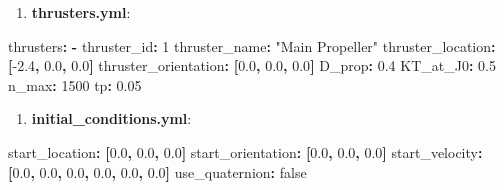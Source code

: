 \documentclass[
  letterpaper,
  DIV=11,
  numbers=noendperiod]{scrreprt}
\newenvironment{Shaded}{\begin{snugshade}}{\end{snugshade}}
\newcommand{\AttributeTok}[1]{\textcolor[rgb]{0.40,0.45,0.13}{#1}}
\newcommand{\CharTok}[1]{\textcolor[rgb]{0.13,0.47,0.30}{#1}}
\newcommand{\DecValTok}[1]{\textcolor[rgb]{0.68,0.00,0.00}{#1}}
\newcommand{\FloatTok}[1]{\textcolor[rgb]{0.68,0.00,0.00}{#1}}
\newcommand{\FunctionTok}[1]{\textcolor[rgb]{0.28,0.35,0.67}{#1}}
\newcommand{\KeywordTok}[1]{\textcolor[rgb]{0.00,0.23,0.31}{\textbf{#1}}}
\newcommand{\StringTok}[1]{\textcolor[rgb]{0.13,0.47,0.30}{#1}}
\providecommand{\tightlist}{%
  \setlength{\itemsep}{0pt}\setlength{\parskip}{0pt}}\usepackage{longtable,booktabs,array}
\begin{document}
\begin{enumerate}
\def\labelenumi{\arabic{enumi}.}
\setcounter{enumi}{5}
\tightlist
\item
  \textbf{thrusters.yml}:
\end{enumerate}

\begin{Shaded}
\begin{Highlighting}[]
\FunctionTok{thrusters}\KeywordTok{:}
\AttributeTok{  }\KeywordTok{{-}}\AttributeTok{ }\FunctionTok{thruster\_id}\KeywordTok{:}\AttributeTok{ }\DecValTok{1}
\AttributeTok{    }\FunctionTok{thruster\_name}\KeywordTok{:}\AttributeTok{ }\StringTok{"Main Propeller"}
\AttributeTok{    }\FunctionTok{thruster\_location}\KeywordTok{:}\AttributeTok{ }\KeywordTok{[}\FloatTok{{-}2.4}\KeywordTok{,}\AttributeTok{ }\FloatTok{0.0}\KeywordTok{,}\AttributeTok{ }\FloatTok{0.0}\KeywordTok{]}
\AttributeTok{    }\FunctionTok{thruster\_orientation}\KeywordTok{:}\AttributeTok{ }\KeywordTok{[}\FloatTok{0.0}\KeywordTok{,}\AttributeTok{ }\FloatTok{0.0}\KeywordTok{,}\AttributeTok{ }\FloatTok{0.0}\KeywordTok{]}
\AttributeTok{    }\FunctionTok{D\_prop}\KeywordTok{:}\AttributeTok{ }\FloatTok{0.4}
\AttributeTok{    }\FunctionTok{KT\_at\_J0}\KeywordTok{:}\AttributeTok{ }\FloatTok{0.5}
\AttributeTok{    }\FunctionTok{n\_max}\KeywordTok{:}\AttributeTok{ }\DecValTok{1500}
\AttributeTok{    }\FunctionTok{tp}\KeywordTok{:}\AttributeTok{ }\FloatTok{0.05}
\end{Highlighting}
\end{Shaded}

\begin{enumerate}
\def\labelenumi{\arabic{enumi}.}
\setcounter{enumi}{6}
\tightlist
\item
  \textbf{initial\_conditions.yml}:
\end{enumerate}

\begin{Shaded}
\begin{Highlighting}[]
\FunctionTok{start\_location}\KeywordTok{:}\AttributeTok{ }\KeywordTok{[}\FloatTok{0.0}\KeywordTok{,}\AttributeTok{ }\FloatTok{0.0}\KeywordTok{,}\AttributeTok{ }\FloatTok{0.0}\KeywordTok{]}
\FunctionTok{start\_orientation}\KeywordTok{:}\AttributeTok{ }\KeywordTok{[}\FloatTok{0.0}\KeywordTok{,}\AttributeTok{ }\FloatTok{0.0}\KeywordTok{,}\AttributeTok{ }\FloatTok{0.0}\KeywordTok{]}
\FunctionTok{start\_velocity}\KeywordTok{:}\AttributeTok{ }\KeywordTok{[}\FloatTok{0.0}\KeywordTok{,}\AttributeTok{ }\FloatTok{0.0}\KeywordTok{,}\AttributeTok{ }\FloatTok{0.0}\KeywordTok{,}\AttributeTok{ }\FloatTok{0.0}\KeywordTok{,}\AttributeTok{ }\FloatTok{0.0}\KeywordTok{,}\AttributeTok{ }\FloatTok{0.0}\KeywordTok{]}
\FunctionTok{use\_quaternion}\KeywordTok{:}\AttributeTok{ }\CharTok{false}
\end{Highlighting}
\end{Shaded}
\end{document}
